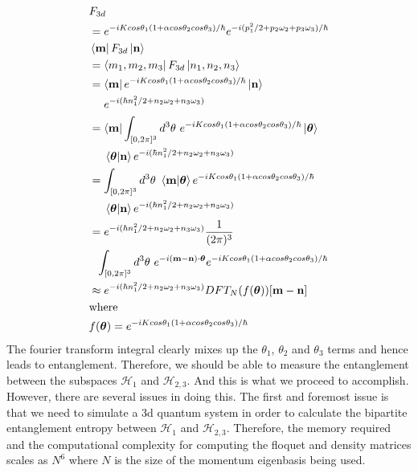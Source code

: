 \documentclass[twocolumn,nobalancelastpage]{report}
\begin{document}
\begin{align}
    &F_{3d} \\
    &= e^{-i K cos\theta_1 (1 + \alpha cos\theta_2 cos\theta_3) / \hbar}
    e^{-i (p_1^2 / 2 + p_2 \omega_2 + p_3 \omega_3)/\hbar} \\
    &\bra{\mathbf{m}} F_{3d} \ket{\mathbf{n}} \\
    &= \bra{m_1, m_2, m_3}F_{3d}\ket{n_1, n_2, n_3} \\
    &= \bra{\mathbf{m}}
    e^{-i K cos\theta_1 (1 + \alpha cos\theta_2 cos\theta_3) / \hbar}
    \ket{\mathbf{n}} \\
    &\ \ \ \ e^{-i (\hbar n_1^2 / 2 + n_2 \omega_2 + n_3 \omega_3)} \\
    &= \bra{\mathbf{m}} \int_{[0,2\pi]^3} d^3\theta \
    e^{-i K cos\theta_1 (1 + \alpha cos\theta_2 cos\theta_3) / \hbar}
    \ket{\boldsymbol{\theta}}\\
    &\ \ \ \ \braket{\boldsymbol{\theta}|\mathbf{n}}
    e^{-i (\hbar n_1^2 / 2 + n_2 \omega_2 + n_3 \omega_3)} \\
    &= \int_{[0,2\pi]^3} d^3\theta \ \braket{\mathbf{m}|\boldsymbol{\theta}}
    e^{-i K cos\theta_1 (1 + \alpha cos\theta_2 cos\theta_3) / \hbar}\\
    &\ \ \ \ \braket{\boldsymbol{\theta}|\mathbf{n}}
    e^{-i (\hbar n_1^2 / 2 + n_2 \omega_2 + n_3 \omega_3)} \\
    &= e^{-i (\hbar n_1^2 / 2 + n_2 \omega_2 + n_3 \omega_3)}
    \frac{1}{(2\pi)^3} \\
    &\ \ \int_{[0,2\pi]^3} d^3\theta \
    e^{-i(\mathbf{m} - \mathbf{n})\cdot \boldsymbol{\theta}}
    e^{-i K cos\theta_1 (1 + \alpha cos\theta_2 cos\theta_3) / \hbar}\\
    &\approx e^{-i (\hbar n_1^2 / 2 + n_2 \omega_2 + n_3 \omega_3)}
    DFT_N(f(\boldsymbol{\theta}))[\mathbf{m} - \mathbf{n}]\\
    &\text{where } \nonumber\\
    &f(\boldsymbol{\theta}) =
    e^{-i K cos\theta_1 (1 + \alpha cos\theta_2 cos\theta_3) / \hbar}
\end{align}
%
The fourier transform integral clearly mixes up the $\theta_1$, $\theta_2$
and $\theta_3$ terms and hence leads to entanglement. Therefore, we
should be able to measure the entanglement between the subspaces
$\mathcal{H}_1$ and $\mathcal{H}_{2,3}$. And this is what we proceed to
accomplish. However, there are several issues in doing this. The first
and foremost issue is that we need to simulate a 3d quantum system in
order to calculate the bipartite entanglement entropy between
$\mathcal{H}_1$ and $\mathcal{H}_{2,3}$. Therefore, the memory required
and the computational complexity for computing the floquet and
density matrices scales as $N^6$ where $N$ is the size of the momentum
eigenbasis being used.
\end{document}
